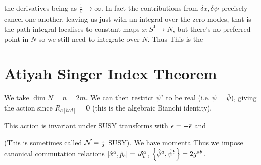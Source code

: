 \documentclass{article}
\begin{document}
the derivatives being as $\frac{1}{\beta} \to \infty$. In fact the contributions from $\delta x, \delta \psi$ precisely cancel one another, leaving us just with an integral over the zero modes, that is the path integral localises to constant maps $x : S^1 \to N$, but there's no preferred point in $N$ so we still need to integrate over $N$. Thus 
This is the 

\section{Atiyah Singer Index Theorem}
We take $\dim N = n = 2m$. We can then restrict $\psi^a$ to be real (i.e. $\psi= \bar{\psi}$), giving the action
since $R_{a[bcd]}=0$ (this is the algebraic Bianchi identity). 
\begin{prop}
This action is invariant under SUSY transforms with $ \eps = - \bar{\eps}$ and 
\end{prop}
(This is sometimes called $\mc{N}=\frac{1}{2}$ SUSY). We have momenta 
Thus we impose canonical commutation relations $\comm[\hat{x}^a]{\hat{p}_b} = i \delta^a_b$, $\acomm[\hat{\psi}^a]{\hat{\psi}^b} = 2g^{ab}$. 


\end{document}
